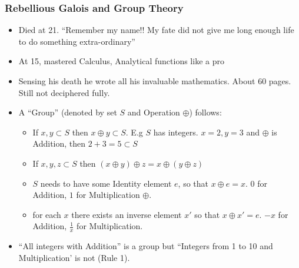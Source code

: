 \begin{frame}[fragile]
\frametitle{Rebellious Galois and Group Theory}
\begin{itemize}[label=\textbullet,noitemsep,nolistsep]
\item Died at 21. ``Remember my name!! My fate did not give me long enough life to do something extra-ordinary''
\item At 15, mastered Calculus, Analytical functions like a pro
\item Sensing his death he wrote all his invaluable mathematics. About 60 pages. Still not deciphered fully.
\item A ``Group'' (denoted by set $S$ and Operation $\oplus$) follows:
	\begin{itemize}[label=\textbullet,noitemsep,nolistsep]
	\item If $x,y \subset S$ then $ x \oplus y \subset S$. E.g $S$ has integers. $x=2,y=3$ and $\oplus$ is Addition, then $2+3=5 \subset S$
	\item If $x,y,z \subset S$ then $( x \oplus y) \oplus z = x \oplus (y \oplus z)$
	\item $S$ needs to have some Identity element $e$, so that $ x \oplus e = x$. $0$ for Addition, $1$ for Multiplication $\oplus$.
	\item for each $x$ there exists an inverse element $x'$ so that $x \oplus x' = e$. $-x$ for Addition, $\frac{1}{x}$ for Multiplication.
	\end{itemize}
\item ``All integers with Addition'' is a group but ``Integers from 1 to 10 and Multiplication' is not (Rule 1).
\end{itemize}
\end{frame}


